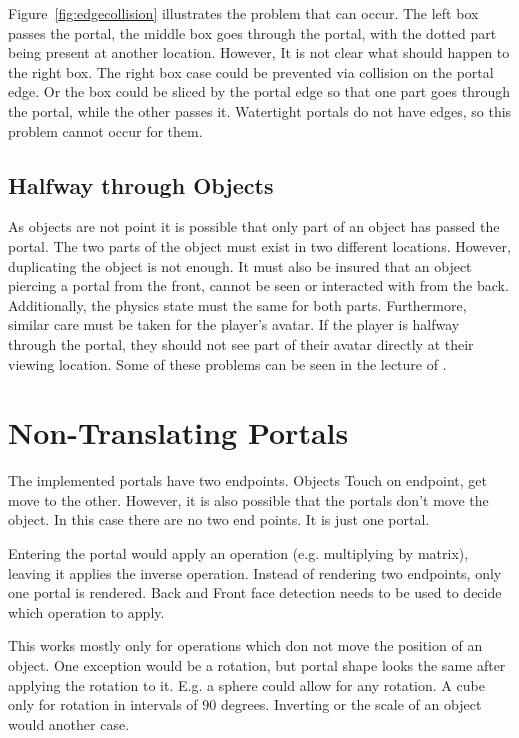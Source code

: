 Figure~\ref{fig:edgecollision} illustrates the problem that can occur. The left box passes the portal, the middle box goes through the portal, with the dotted part being present at another location. However, It is not clear what should happen to the right box. The right box case could be prevented via collision on the portal edge. Or the box could be sliced by the portal edge so that one part goes through the portal, while the other passes it. Watertight portals do not have edges, so this problem cannot occur for them.

\subsection{Halfway through Objects}
As objects are not point it is possible that only part of an object has passed the portal. The two parts of the object must exist in two different locations. However, duplicating the object is not enough. It must also be insured that an object piercing a portal from the front, cannot be seen or interacted with from the back. Additionally, the physics state must the same for both parts.  Furthermore, similar care must be taken for the player's avatar. If the player is halfway through the portal, they should not see part of their avatar directly at their viewing location. Some of these problems can be seen in the lecture of \textcite{lecture:portalProblems}.


\section{Non-Translating Portals}
The implemented portals have two endpoints. Objects Touch on endpoint, get move to the other. However, it is also possible that the portals don't move the object. In this case there are no two end points. It is just one portal.

Entering the portal would apply an operation (e.g. multiplying by matrix), leaving it applies the inverse operation. Instead of rendering two endpoints, only one portal is rendered. Back and Front face detection needs to be used to decide which operation to apply.

This works mostly only for operations which don not move the position of an object. One exception would be a rotation, but portal shape looks the same after applying the rotation to it. E.g. a sphere could allow for any rotation. A cube only for rotation in intervals of 90 degrees. Inverting or the scale of an object would another case.



